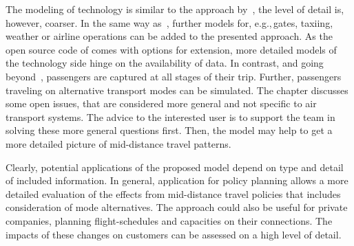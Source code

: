 The modeling of technology is similar to the approach by~\citet{ClarkeEtAl2007AirNetworkSim}, the level of detail is, however, coarser. 
In the same way as~\citet{ClarkeEtAl2007AirNetworkSim}, further models for, e.g.,\,gates, taxiing, weather or airline operations can be added to the presented approach. 
As the open source code of  comes with options for extension, more detailed models of the technology side hinge on the availability of data. 
In contrast, and going beyond~\citet{ClarkeEtAl2007AirNetworkSim}, passengers are captured at all stages of their trip. 
Further, passengers traveling on alternative transport modes can be simulated. 
The chapter discusses some open issues, that are considered more general and not specific to air transport systems. 
The advice to the interested user is to support the  team in solving these more general questions first.  
Then, the model may help to get a more detailed picture of mid-distance travel patterns.

Clearly, potential applications of the proposed model depend on type and detail of included information. 
In general, application for policy planning allows a more detailed evaluation of the effects from mid-distance travel policies that includes consideration of mode alternatives. 
The approach could also be useful for private companies, planning flight-schedules and capacities on their connections. 
The impacts of these changes on customers can be assessed on a high level of detail. 


